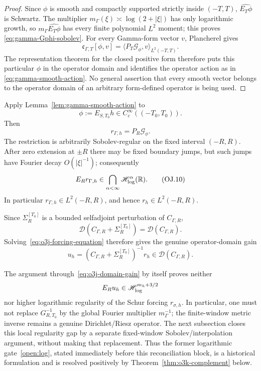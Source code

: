 \begin{proof}
Since $\phi$ is smooth and compactly supported strictly inside $(-T,T)$,
$\widehat{E_T\phi}$ is Schwartz.  The multiplier
$m_\Gamma(\xi)\asymp\log(2+|\xi|)$ has only logarithmic growth, so
$m_\Gamma\widehat{E_T\phi}$ has every finite polynomial $L^2$ moment; this proves
\eqref{eq:gamma-Gphi-sobolev}.  For every Gamma-form vector $v$,
Plancherel gives
\[
 \mathfrak c_{\Gamma,T}[\phi,v]
 =\langle P_T\mathcal G_\phi,v\rangle_{L^2(-T,T)}.
\]
The representation theorem for the closed positive form therefore puts this particular
$\phi$ in the operator domain and identifies the operator action as in
\eqref{eq:gamma-smooth-action}.  No general assertion that every smooth vector belongs
to the operator domain of an arbitrary form-defined operator is being used.
\end{proof}

Apply Lemma~\ref{lem:gamma-smooth-action} to
\[
 \phi:=E_{S,T_0}h\in C_c^\infty((-T_0,T_0)).
\]
Then
\[
 r_{\Gamma,h}=P_R\mathcal G_\phi.
\tag{OJ.9}\label{eq:o3j-gamma-forcing}
\]
The restriction is arbitrarily Sobolev-regular on the fixed interval $(-R,R)$.  After
zero extension at $\pm R$ there may be fixed boundary jumps, but such jumps have Fourier
decay $O(|\xi|^{-1})$; consequently
\[
 E_Rr_{\Gamma,h}
 \in\bigcap_{\alpha<\infty}\mathscr H_{\log}^\alpha(\mathbb R).
\tag{OJ.10}\label{eq:o3j-gamma-logregular}
\]
In particular $r_{\Gamma,h}\in L^2(-R,R)$, and hence $r_h\in L^2(-R,R)$.

Since $\Sigma_R^{[T_0]}$ is a bounded selfadjoint perturbation of $C_{\Gamma,R}$,
\[
 \mathcal D(C_{\Gamma,R}+\Sigma_R^{[T_0]})
 =\mathcal D(C_{\Gamma,R}).
\]
Solving~\eqref{eq:o3j-forcing-equation} therefore gives the genuine operator-domain
gain
\[
 \boxed{
 u_h
 =(C_{\Gamma,R}+\Sigma_R^{[T_0]})^{-1}r_h
 \in\mathcal D(C_{\Gamma,R}).
 }
\tag{OJ.11}\label{eq:o3j-domain-gain}
\]

\begin{remark}\label{rem:o3j-firewall}
The argument through~\eqref{eq:o3j-domain-gain} by itself proves neither
\[
 E_Ru_h\in\mathscr H_{\log}^{m_h+3/2}
\]
nor higher logarithmic regularity of the Schur forcing $r_{\sigma,h}$.  In particular,
one must not replace $G_{R,T_0}^{-1}$ by the global Fourier multiplier
$m_\Gamma^{-1}$; the finite-window metric inverse remains a genuine Dirichlet/Riesz
operator.  The next subsection closes this local regularity gap by a separate
fixed-window Sobolev/interpolation argument, without making that replacement.  Thus
the former logarithmic gate~\ref{open:log}, stated immediately before this
reconciliation block, is a historical formulation and is resolved positively by
Theorem~\ref{thm:o3k-complement} below.
\end{remark}

